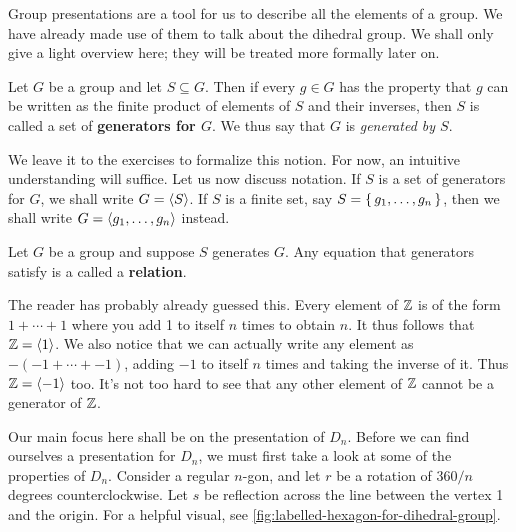 \documentclass[./main.tex]{subfiles}
\begin{document}
Group presentations are a tool for us to describe all the elements
of a group. We have already made use of them to talk about the dihedral group.
We shall only give a light overview here; they will be treated more formally
later on. 


\begin{definition}[Generator]
\label{def:generator}
    Let $G$ be a group and let $S \subseteq G$. Then if every $g \in G$ has the
    property that $g$ can be written as the finite product of elements of $S$
    and their inverses, then $S$ is called a set of \textbf{generators for $G$}.
    We thus say that $G$ is \emph{generated by $S$}.
\end{definition}
We leave it to the exercises to formalize this notion. For now, an intuitive
understanding will suffice. Let us now discuss notation. If $S$ is a set of
generators for $G$, we shall write $G = { \langle S \rangle }$. If $S$ is a finite set, say $S
= \set{g_1, \dots, g_n}$, then we shall write $G = { \langle g_1, \dots, g_n \rangle }$
instead.



\begin{definition}[Relation]
\label{def:relation}
    Let $G$ be a group and suppose $S$ generates $G$. Any equation that
    generators satisfy is a called a \textbf{relation}.
\end{definition}

\begin{example}[Presentation of $\bZ$]
    The reader has probably already guessed this. Every element of $\bZ$ is of
    the form $1 + \cdots + 1$ where you add 1 to itself $n$ times to obtain $n$.
    It thus follows that $\mathbb{Z} = { \langle 1 \rangle }$. We also notice that we can actually
    write any element as $-( -1 + \cdots + -1)$, adding $-1$ to itself $n$ times
    and taking the inverse of it. Thus $\mathbb{Z} = { \langle -1 \rangle }$ too. It's not too hard
    to see that any other element of $\bZ$ cannot be a generator of $\bZ$.  
\end{example}


Our main focus here shall be on the presentation of $D_n$. Before we can find
ourselves a presentation for $D_n$, we must first take a look at some of the
properties of $D_n$. Consider a regular $n$-gon, and let $r$ be a rotation of
$360/n$ degrees counterclockwise. Let $s$ be reflection across the line between
the vertex 1 and the origin. For a helpful visual, see
\cref{fig:labelled-hexagon-for-dihedral-group}.
\end{document}
